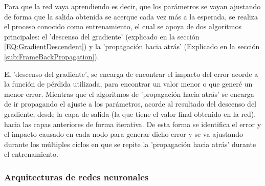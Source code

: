             Para que la red vaya aprendiendo es decir, que los parámetros se vayan ajustando de forma que la salida obtenida se acerque cada vez más a la esperada, se realiza el proceso conocido como entrenamiento, el cual se apoya de dos algoritmos principales: el 'descenso del gradiente'  (explicado en la sección \ref{EQ:GradientDescendent}) y la 'propagación hacia atrás'  (Explicado en la sección \ref{sub:FrameBackPropagation}).
            
            El 'descenso del gradiente', se encarga de encontrar el impacto del error acorde a la función de pérdida  utilizada, para encontrar un valor menor o que generé un menor error. Mientras que el algoritmos de 'propagación hacia atrás' se encarga de ir propagando el ajuste a los parámetros, acorde al resultado del descenso del gradiente, desde la capa de salida (la que tiene el valor final obtenido en la red), hacia las capas anteriores de forma iterativa. De esta forma se identifica el error y el impacto causado en cada nodo para generar dicho error y se va ajustando durante los múltiples ciclos en que se repite la 'propagación hacia atrás' durante el entrenamiento.
            
        \subsubsection{Arquitecturas de redes neuronales}
        \label{sub2:FrameNNArchitecture}
        
